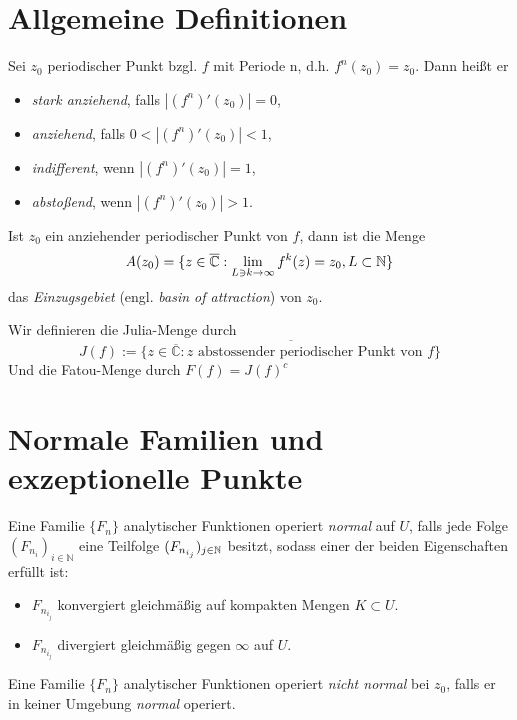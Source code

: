 \documentclass{mywork}
\begin{document}
\section{Allgemeine Definitionen}

\begin{df} \label{1}
Sei $z_0$ periodischer Punkt bzgl. $f$ mit Periode n, d.h. $f^n(z_0)=z_0$. Dann heißt er
\begin{itemize}
\item \emph{stark anziehend}, falls $|(f^n)'(z_0)|=0$,
\item \emph{anziehend}, falls $0<|(f^n)'(z_0)|<1$,
\item \emph{indifferent}, wenn $|(f^n)'(z_0)|=1$,
\item \emph{abstoßend}, wenn $|(f^n)'(z_0)|>1$.
\end{itemize} 
\end{df}


\begin{df}[Einzugsgebiet] \label{2}
Ist $z_0$ ein anziehender periodischer Punkt von $f$, dann ist die Menge
\[
	A(z_0)=\{z\in \overline{\mathbb{C}}: \lim\limits_{L\ni k\to \infty} f^k(z)=z_0, L\subset \mathbb{N}\}
\]
das \emph{Einzugsgebiet} (engl. \emph{basin of attraction}) von $z_0$.
\end{df}



\begin{df} \label{3}
Wir definieren die Julia-Menge durch
\[
J(f):=\overline{\{z\in \overline{\mathbb{C}}: z \text{ abstossender periodischer Punkt von $f$} \}}
\]
Und die Fatou-Menge durch $F(f)=J(f)^c$
\end{df}


\section{Normale Familien und exzeptionelle Punkte}

\begin{df} \label{4}
Eine Familie $\{F_n\}$ analytischer Funktionen operiert \emph{normal} auf $U$, falls jede Folge $(F_{n_i})_{i\in \mathbb{N}}$ eine Teilfolge $(F_{n_{i_j}})_{j\in \mathbb{N}}$ besitzt, sodass einer der beiden Eigenschaften erfüllt ist:
\begin{itemize}
\item $F_{n_{i_j}}$ konvergiert gleichmäßig auf kompakten Mengen $K\subset U$.
\item $F_{n_{i_j}}$ divergiert gleichmäßig gegen $\infty$ auf $U$.
\end{itemize}
Eine Familie $\{F_n\}$ analytischer Funktionen operiert \emph{nicht normal} bei $z_0$, falls er in keiner Umgebung \emph{normal} operiert.
\end{df}
\end{document}
